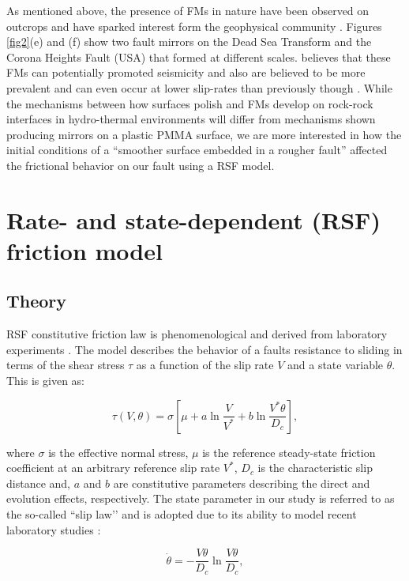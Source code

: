 \documentclass[preprint,1p, 10pt,authoryear]{elsarticle}
\begin{document}
As mentioned above, the presence of FMs in nature have been observed on outcrops and have sparked interest form the geophysical community \citep{Fondriest2013, Kirkpartick2013, Siman-Tov2013}.  Figures \ref{fig2}(e) and (f) show two fault mirrors on the Dead Sea Transform and the Corona Heights Fault (USA) that formed at different scales.  \citep{Goldberg2016} believes that these FMs can potentially promoted seismicity and also are believed to be more prevalent and can even occur at lower slip-rates than previously though \citep{Verbena2019}.  While the mechanisms between how surfaces polish and FMs develop on rock-rock interfaces in hydro-thermal environments will differ from mechanisms shown producing mirrors on a plastic PMMA surface, we are  more interested in how the initial conditions of a ``smoother surface embedded in a rougher fault'' affected the frictional behavior on our fault using a RSF model. 

\section{Rate- and state-dependent (RSF) friction model}
\subsection{Theory}
\label{Theory}
RSF constitutive friction law is phenomenological and derived from laboratory experiments \citep{Dieterich1979, Ruina1983}.  The model describes the behavior of a faults resistance to sliding in terms of the shear stress $\tau$ as a function of the slip rate $V$ and a state variable $\theta$. This is given as:

\begin{equation}
\label{eq5}
\tau \left( V,\theta \right) = \sigma \left[\mu + a \ln\frac{V}{V^{*}} + b \ln\frac{V^{*}\theta}{D_{c}}\right],
\end{equation}   

\noindent where $\sigma$ is the effective normal stress, $\mu$ is the reference steady-state friction coefficient at an arbitrary reference slip rate $V^{*}$, $D_{c}$ is the characteristic slip distance and, $a$ and $b$ are constitutive parameters describing the direct and evolution effects, respectively.  The state parameter in our study is referred to as the so-called ``slip law’’ and is adopted due to its ability to model recent laboratory studies \citep{Bhattacharya2015, Kaneko2011, Kaneko2016}:

\begin{equation}
\label{eq6}
\dot{\theta} = - \frac{V\theta}{D_{c}}\ln\frac{V\theta}{D_{c}},
\end{equation}   
\end{document}
